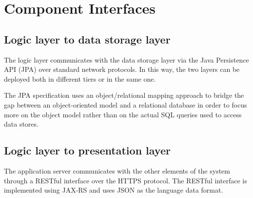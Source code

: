 \section{Component Interfaces}

\subsection{Logic layer to data storage layer}
The logic layer communicates with the data storage layer via the Java Persistence API (JPA) over standard network protocols.
In this way, the two layers can be deployed both in different tiers or in the same one.

The JPA specification uses an object/relational mapping approach to bridge the gap between an object-oriented model and a relational database in order to focus more on the object model rather than on the actual SQL queries used to access data stores.

\subsection{Logic layer to presentation layer}

The application server communicates with the other elements of the system through a RESTful interface over the HTTPS protocol.
The RESTful interface is implemented using JAX-RS and uses JSON as the language data format.

